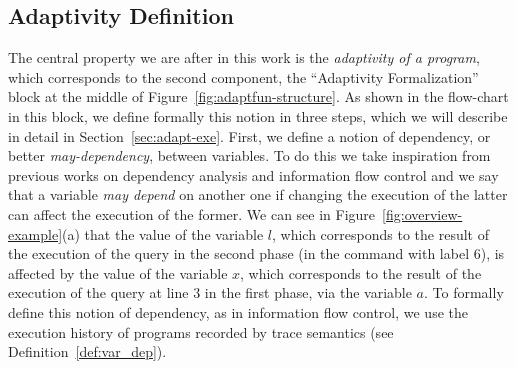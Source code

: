 \subsection{Adaptivity Definition}
\label{sec:adaptivity-informal}
The central property we are after in this work is the \emph{adaptivity of a program},
which corresponds to the second component, the ``Adaptivity Formalization'' block at the middle of Figure~\ref{fig:adaptfun-structure}.
As shown in the flow-chart in this block, we define formally this notion in three steps, which we will describe in detail in Section~\ref{sec:adapt-exe}. First, we define a notion of dependency, or better \emph{may-dependency}, between variables. To do this we take inspiration from previous works on dependency analysis and information flow control and we say that a variable \emph{may depend} on another one if changing the execution of the latter can affect the execution of the former. 
We can see in Figure~\ref{fig:overview-example}(a) that the value of the variable $l$, which corresponds to the result of the execution of the query in the second phase (in the command with label 6), is affected by the value of the variable $x$, which corresponds to the result of the execution of the query at line 3 in the first phase, via the variable $a$.
To formally define this notion of dependency, as in information flow control, we use the execution history of programs recorded by trace semantics (see Definition~\ref{def:var_dep}).

